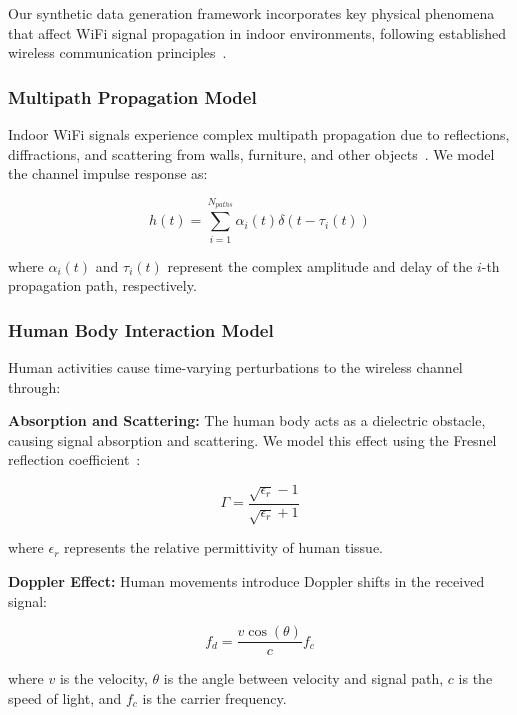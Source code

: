 \documentclass[journal]{IEEEtran}
\begin{document}
Our synthetic data generation framework incorporates key physical phenomena that affect WiFi signal propagation in indoor environments, following established wireless communication principles~\cite{goldsmith2005wireless}.

\subsubsection{Multipath Propagation Model}

Indoor WiFi signals experience complex multipath propagation due to reflections, diffractions, and scattering from walls, furniture, and other objects~\cite{multipath_fading2003}. We model the channel impulse response as:

\begin{equation}
h(t) = \sum_{i=1}^{N_{paths}} \alpha_i(t) \delta(t - \tau_i(t))
\end{equation}

where $\alpha_i(t)$ and $\tau_i(t)$ represent the complex amplitude and delay of the $i$-th propagation path, respectively.

\subsubsection{Human Body Interaction Model}

Human activities cause time-varying perturbations to the wireless channel through:

\textbf{Absorption and Scattering:} The human body acts as a dielectric obstacle, causing signal absorption and scattering. We model this effect using the Fresnel reflection coefficient~\cite{fresnel_reflection1995}:

\begin{equation}
\Gamma = \frac{\sqrt{\epsilon_r} - 1}{\sqrt{\epsilon_r} + 1}
\end{equation}

where $\epsilon_r$ represents the relative permittivity of human tissue.

\textbf{Doppler Effect:} Human movements introduce Doppler shifts in the received signal:

\begin{equation}
f_d = \frac{v \cos(\theta)}{c} f_c
\end{equation}

where $v$ is the velocity, $\theta$ is the angle between velocity and signal path, $c$ is the speed of light, and $f_c$ is the carrier frequency.
\end{document}
